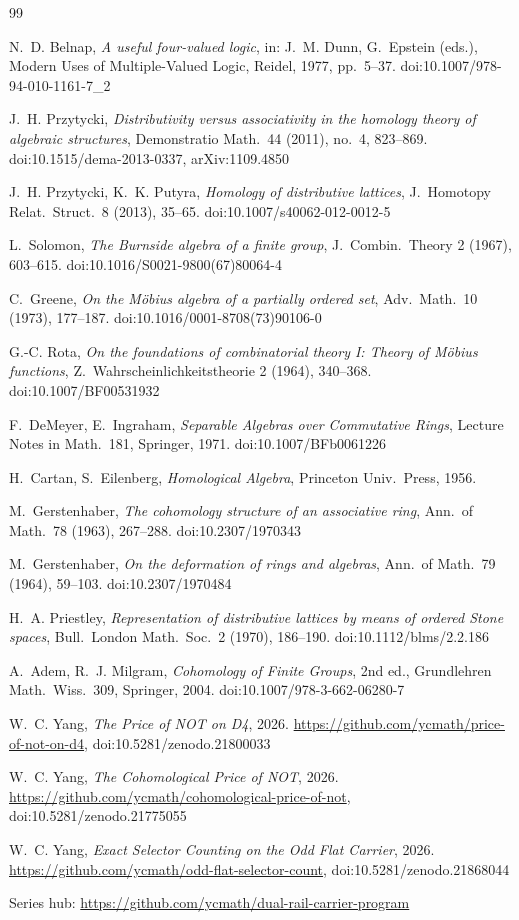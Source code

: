 \documentclass[11pt]{article}
\theoremstyle{definition}
\theoremstyle{remark}
\begin{document}
\begin{thebibliography}{99}

 N.~D. Belnap, \emph{A useful four-valued logic}, in: J.~M. Dunn, G.~Epstein (eds.), Modern Uses of Multiple-Valued Logic, Reidel, 1977, pp.~5--37. doi:10.1007/978-94-010-1161-7\_2

 J.~H. Przytycki, \emph{Distributivity versus associativity in the homology theory of algebraic structures}, Demonstratio Math.\ 44 (2011), no.~4, 823--869. doi:10.1515/dema-2013-0337, arXiv:1109.4850

 J.~H. Przytycki, K.~K. Putyra, \emph{Homology of distributive lattices}, J.\ Homotopy Relat.\ Struct.\ 8 (2013), 35--65. doi:10.1007/s40062-012-0012-5

 L.~Solomon, \emph{The Burnside algebra of a finite group}, J.\ Combin.\ Theory 2 (1967), 603--615. doi:10.1016/S0021-9800(67)80064-4

 C.~Greene, \emph{On the M\"obius algebra of a partially ordered set}, Adv.\ Math.\ 10 (1973), 177--187. doi:10.1016/0001-8708(73)90106-0

 G.-C. Rota, \emph{On the foundations of combinatorial theory I: Theory of M\"obius functions}, Z.\ Wahrscheinlichkeitstheorie 2 (1964), 340--368. doi:10.1007/BF00531932

 F.~DeMeyer, E.~Ingraham, \emph{Separable Algebras over Commutative Rings}, Lecture Notes in Math.\ 181, Springer, 1971. doi:10.1007/BFb0061226

 H.~Cartan, S.~Eilenberg, \emph{Homological Algebra}, Princeton Univ.\ Press, 1956.

 M.~Gerstenhaber, \emph{The cohomology structure of an associative ring}, Ann.\ of Math.\ 78 (1963), 267--288. doi:10.2307/1970343

 M.~Gerstenhaber, \emph{On the deformation of rings and algebras}, Ann.\ of Math.\ 79 (1964), 59--103. doi:10.2307/1970484

 H.~A. Priestley, \emph{Representation of distributive lattices by means of ordered Stone spaces}, Bull.\ London Math.\ Soc.\ 2 (1970), 186--190. doi:10.1112/blms/2.2.186

 A.~Adem, R.~J. Milgram, \emph{Cohomology of Finite Groups}, 2nd ed., Grundlehren Math.\ Wiss.\ 309, Springer, 2004. doi:10.1007/978-3-662-06280-7

 W.~C. Yang, \emph{The Price of NOT on D4}, 2026. \url{https://github.com/ycmath/price-of-not-on-d4}, doi:10.5281/zenodo.21800033

 W.~C. Yang, \emph{The Cohomological Price of NOT}, 2026. \url{https://github.com/ycmath/cohomological-price-of-not}, doi:10.5281/zenodo.21775055

 W.~C. Yang, \emph{Exact Selector Counting on the Odd Flat Carrier}, 2026. \url{https://github.com/ycmath/odd-flat-selector-count}, doi:10.5281/zenodo.21868044

\end{thebibliography}

\noindent Series hub: \url{https://github.com/ycmath/dual-rail-carrier-program}
\end{document}
